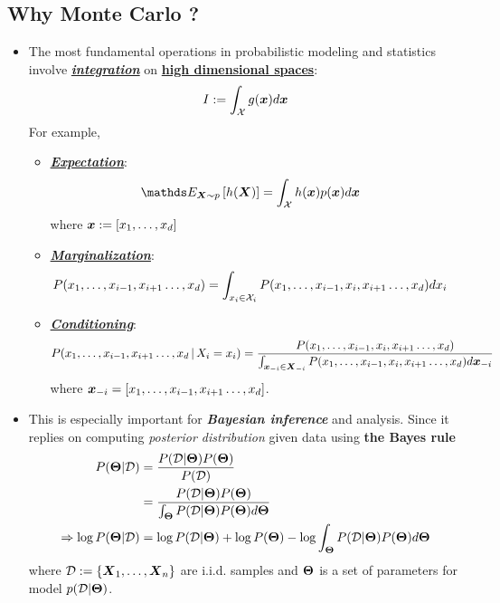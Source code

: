 \documentclass[11pt]{article}
\begin{document}
\subsection{Why Monte Carlo ?}
\begin{itemize}
\item The most fundamental operations in probabilistic modeling and statistics involve \underline{\emph{\textbf{integration}}} on \underline{\textbf{high dimensional spaces}}:
\begin{align*}
I := \int_{{\mathcal X}} g(\boldsymbol{x})d\boldsymbol{x}
\end{align*} For example, 
\begin{itemize}
\item \underline{\emph{\textbf{Expectation}}}: 
\begin{align}
\E{\mb{X}\sim p}{h(\mb{X})} &= \int_{\cX}h(\mb{x})p(\mb{x}) d\mb{x}  \label{eqn: exp_integration}
\end{align} where $\boldsymbol{x}:= [x_1,\ldots, x_d]$

\item \underline{\emph{\textbf{Marginalization}}}:
\begin{align*}
P(x_1,\ldots, x_{i-1}, x_{i+1} \ldots, x_d) &= \int_{x_i \in {\mathcal X}_i}P(x_1,\ldots, x_{i-1}, x_i, x_{i+1} \ldots, x_d) d x_i
\end{align*}

\item \underline{\emph{\textbf{Conditioning}}}:
\begin{align*}
P(x_1,\ldots, x_{i-1}, x_{i+1} \ldots, x_d \,|\, X_i = x_i) 
&= \frac{P(x_1,\ldots, x_{i-1}, x_i, x_{i+1} \ldots, x_d)}{ \int_{\boldsymbol{x}_{-i} \in \boldsymbol{X}_{-i}}P(x_1,\ldots, x_{i-1}, x_i, x_{i+1} \ldots, x_d) d\boldsymbol{x}_{-i}}
\end{align*} where $\boldsymbol{x}_{-i} = [x_1,\ldots, x_{i-1}, x_{i+1} \ldots, x_d]$.
\end{itemize}

\item This is especially important for \emph{\textbf{Bayesian inference}} and analysis. Since it replies on computing \emph{posterior distribution}  given data using \textbf{the Bayes rule}
\begin{align*}
P(\boldsymbol{\Theta} | {\mathcal D}) &= \frac{P({\mathcal D} | \boldsymbol{\Theta}) P(\boldsymbol{\Theta})}{P({\mathcal D})}\\
 &= \frac{P({\mathcal D} | \boldsymbol{\Theta}) P(\boldsymbol{\Theta})}{\int_{\boldsymbol{\Theta}} P({\mathcal D} | \boldsymbol{\Theta}) P(\boldsymbol{\Theta}) d \boldsymbol{\Theta}}\\
 \Rightarrow \log P(\boldsymbol{\Theta} | {\mathcal D})  &= \log P({\mathcal D} | \boldsymbol{\Theta}) + \log P(\boldsymbol{\Theta}) - \log \int_{\boldsymbol{\Theta}} P({\mathcal D} | \boldsymbol{\Theta}) P(\boldsymbol{\Theta}) d \boldsymbol{\Theta}
\end{align*} where ${\mathcal D}: =\left\{\boldsymbol{X}_1, \ldots, \boldsymbol{X}_n\right\}$ are i.i.d. samples and $\boldsymbol{\Theta}$ is a set of parameters for model $p({\mathcal D} | \boldsymbol{\Theta})$.


\end{itemize}
\end{document}

